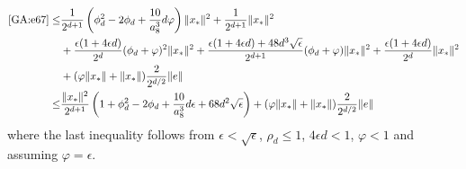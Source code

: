 \begin{align}
\eqref{GA:e67} \leq&
\frac{1}{2^{d+1}} \left( \phi_d^2 - 2 \phi_d + \frac{10}{a_8^3} d \varphi \right) \|x_*\|^2 + \frac{1}{2^{d+1}} \|x_*\|^2 \nonumber \\
&+
\frac{\epsilon (1 + 4 \epsilon d)}{2^d} (\phi_d + \varphi)^2 \|x_*\|^2 + \frac{\epsilon(1 + 4 \epsilon d) + 48 d^3 \sqrt{\epsilon}}{2^{d+1}} (\phi_d + \varphi)\|x_*\|^2 + \frac{\epsilon (1 + 4 \epsilon d)}{2^d} \|x_*\|^2  \nonumber \\
&+
(\varphi \|x_*\| + \|x_*\|) \frac{2}{2^{d/2}} \|e\| \nonumber \\%
%
\leq&
\frac{ \|x_*\|^2 }{2^{d+1}}
\left(
1+
\phi_d^2 - 2 \phi_d + \frac{10}{a_8^3} d \epsilon
+
68 d^2 \sqrt{\epsilon}
\right)
+
(\varphi \|x_*\| + \|x_*\|) \frac{2}{2^{d/2}} \|e\| \label{GA:e42}
\end{align}
where the last inequality follows from $\epsilon < \sqrt{\epsilon}$, $\rho_d \leq 1$, $4 \epsilon d < 1$, $\varphi < 1$ and assuming $\varphi = \epsilon$.

